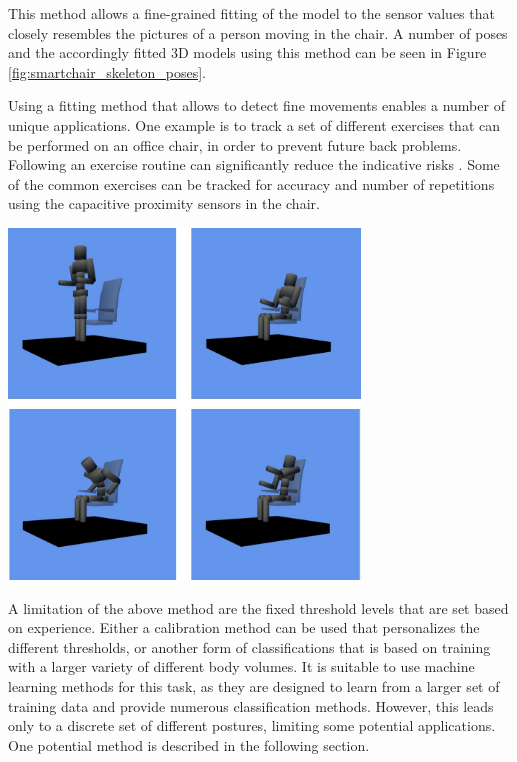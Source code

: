 This method allows a fine-grained fitting of the model to the sensor values that closely resembles the pictures of a person moving in the chair. A number of poses and the accordingly fitted 3D models using this method can be seen in Figure \ref{fig:smartchair_skeleton_poses}.

Using a fitting method that allows to detect fine movements enables a number of unique applications. One example is to track a set of different exercises that can be performed on an office chair, in order to prevent future back problems. Following an exercise routine can significantly reduce the indicative risks \cite{robertson2009effects}. Some of the common exercises can be tracked for accuracy and number of repetitions using the capacitive proximity sensors in the chair.

\begin{minipage}{\linewidth}
\centering
\includegraphics[width=0.7\textwidth]{images/smartchair_skeleton_poses}
\label{fig:smartchair_skeleton_poses}
\end{minipage}

A limitation of the above method are the fixed threshold levels that are set based on experience. Either a calibration method can be used that personalizes the different thresholds, or another form of classifications that is based on training with a larger variety of different body volumes. It is suitable to use machine learning methods for this task, as they are designed to learn from a larger set of training data and provide numerous classification methods. However, this leads only to a discrete set of different postures, limiting some potential applications. One potential method is described in the following section.

